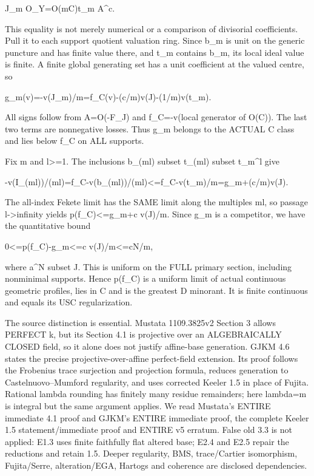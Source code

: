 \documentclass[11pt]{article}
\begin{document}
J\_m O\_Y=O(mC)t\_m A\textasciicircum{}c.

This equality is not merely numerical or a comparison of divisorial coefficients. Pull it to each support quotient valuation ring. Since b\_m is unit on the generic puncture and has finite value there, and t\_m contains b\_m, its local ideal value is finite. A finite global generating set has a unit coefficient at the valued centre, so

g\_m(v)=-v(J\_m)/m=f\_C(v)-(c/m)v(J)-(1/m)v(t\_m).

All signs follow from A=O(-F\_J) and f\_C=-v(local generator of O(C)). The last two terms are nonnegative losses. Thus g\_m belongs to the ACTUAL C class and lies below f\_C on ALL supports.

Fix m and l>=1. The inclusions b\_(ml) subset t\_(ml) subset t\_m\textasciicircum{}l give

-v(I\_(ml))/(ml)=f\_C-v(b\_(ml))/(ml)<=f\_C-v(t\_m)/m=g\_m+(c/m)v(J).

The all-index Fekete limit has the SAME limit along the multiples ml, so passage l->infinity yields p(f\_C)<=g\_m+c v(J)/m. Since g\_m is a competitor, we have the quantitative bound

0<=p(f\_C)-g\_m<=c v(J)/m<=cN/m,

where a\textasciicircum{}N subset J. This is uniform on the FULL primary section, including nonminimal supports. Hence p(f\_C) is a uniform limit of actual continuous geometric profiles, lies in C and is the greatest D minorant. It is finite continuous and equals its USC regularization.

The source distinction is essential. Mustata 1109.3825v2 Section 3 allows PERFECT k, but its Section 4.1 is projective over an ALGEBRAICALLY CLOSED field, so it alone does not justify affine-base generation. GJKM 4.6 states the precise projective-over-affine perfect-field extension. Its proof follows the Frobenius trace surjection and projection formula, reduces generation to Castelnuovo--Mumford regularity, and uses corrected Keeler 1.5 in place of Fujita. Rational lambda rounding has finitely many residue remainders; here lambda=m is integral but the same argument applies. We read Mustata's ENTIRE immediate 4.1 proof and GJKM's ENTIRE immediate proof, the complete Keeler 1.5 statement/immediate proof and ENTIRE v5 erratum. False old 3.3 is not applied: E1.3 uses finite faithfully flat altered base; E2.4 and E2.5 repair the reductions and retain 1.5. Deeper regularity, BMS, trace/Cartier isomorphism, Fujita/Serre, alteration/EGA, Hartogs and coherence are disclosed dependencies.
\end{document}
